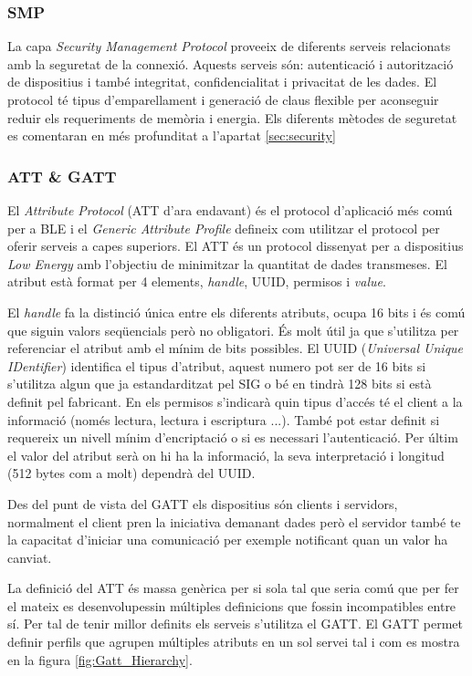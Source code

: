 \subsubsection{SMP}
La capa \textit{Security Management Protocol} proveeix de diferents serveis relacionats amb la seguretat de la connexió.
Aquests serveis són: autenticació i autorització de dispositius i també integritat, confidencialitat i privacitat de les dades.
El protocol té tipus d'emparellament i generació de claus flexible per aconseguir reduir els requeriments de memòria i energia.
Els diferents mètodes de seguretat es comentaran en més profunditat a l'apartat \ref{sec:security}

\subsubsection{ATT \& GATT}
El \textit{Attribute Protocol} (ATT d'ara endavant) és el protocol d'aplicació més comú per a BLE i el \textit{Generic Attribute Profile} defineix com utilitzar el protocol per oferir serveis a capes superiors.
El ATT és un protocol dissenyat per a dispositius \textit{Low Energy} amb l'objectiu de minimitzar la quantitat de dades transmeses. El atribut està format per 4 elements, \textit{handle}, UUID, permisos  i \textit{value}.

El \textit{handle} fa la distinció única entre els diferents atributs, ocupa 16 bits i és comú que siguin valors seqüencials però no obligatori. És molt útil ja que s'utilitza per referenciar el atribut amb el mínim de bits possibles.
El UUID (\textit{Universal Unique IDentifier}) identifica el tipus d'atribut, aquest numero pot ser de 16 bits si s'utilitza algun que ja estandarditzat pel SIG o bé en tindrà 128 bits si està definit pel fabricant.
En els permisos s'indicarà quin tipus d'accés té el client a la informació (només lectura, lectura i escriptura ...). També pot estar definit si requereix un nivell mínim d'encriptació o si es necessari l'autenticació.
Per últim el valor del atribut serà on hi ha la informació, la seva interpretació i longitud (512 bytes com a molt) dependrà del UUID.

Des del punt de vista del GATT els dispositius són clients i servidors, normalment el client pren la iniciativa demanant dades però el servidor també te la capacitat d'iniciar una comunicació per exemple notificant quan un valor ha canviat.

La definició del ATT és massa genèrica per si sola tal que seria comú que per fer el mateix es desenvolupessin múltiples definicions que fossin incompatibles entre sí.
Per tal de tenir millor definits els serveis s'utilitza el GATT.
El GATT permet definir perfils que agrupen múltiples atributs en un sol servei \cite{services} tal i com es mostra en la figura \ref{fig:Gatt_Hierarchy}.

